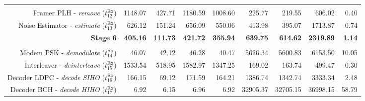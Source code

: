 \begin{table}[htp]
{{\begin{tabular}{r | r r r r  | r r r | r}
                                                                              &                  &                   &                   &                                         &                   &                   &                   &                \\
                       Framer PLH -        \emph{remove} ($t^\text{Rx}_{12}$) &         1148.07  &           427.71  &          1180.59  &                                1008.60  &           225.77  &           219.55  &           606.02  &          0.40  \\
                  Noise Estimator -      \emph{estimate} ($t^\text{Rx}_{13}$) &          626.12  &           151.24  &           656.09  &                                 550.06  &           413.98  &           395.07  &          1713.87  &          0.74  \\ \hline
                                                             \textbf{Stage 6} &  \textbf{405.16} &   \textbf{111.73} &   \textbf{421.72} &                         \textbf{355.94} &   \textbf{639.75} &   \textbf{614.62} &  \textbf{2319.89} &  \textbf{1.14} \\ %
                                                                              &                  &                   &                   &                                         &                   &                   &                   &                \\
                        Modem PSK -    \emph{demodulate} ($t^\text{Rx}_{14}$) &           46.07  &            42.12  &            46.28  &                                  40.47  &          5626.34  &          5600.83  &          6153.50  &         10.05  \\
                      Interleaver -  \emph{deinterleave} ($t^\text{Rx}_{15}$) &         1533.54  &           518.95  &          1582.97  &                                1347.25  &           169.02  &           163.74  &           499.47  &          0.30  \\
                     Decoder LDPC -   \emph{decode SIHO} ($t^\text{Rx}_{16}$) &          166.15  &            69.12  &           171.59  &                                 164.21  &          1386.74  &          1342.74  &          3333.34  &          2.48  \\
                      Decoder BCH -   \emph{decode HIHO} ($t^\text{Rx}_{17}$) &            6.92  &             6.15  &             6.96  &                                   6.92  &         32905.37  &         32705.15  &         36998.15  &         58.79  \\

\end{tabular}}}
\end{table}
